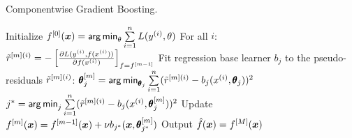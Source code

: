 
\begin{algorithm}[H]
  \begin{footnotesize}
  \begin{center}
  \caption{Componentwise Gradient Boosting.}
    \begin{algorithmic}[1]
      \State Initialize $f^{[0]}(\bm{x}) = \mathop{\sf arg\,min}_{\theta} \sum  \limits_{i=1}^n L(y^{(i)}, \theta)$
        \State For all $i$: $\tilde{r}^{[m](i)} = -\left[\frac{\partial L(y^{(i)}, f(x^{(i)}))}{\partial f(x^{(i)})}\right]_{f=f^{[m-1]}}$
          \State Fit regression base learner $b_j$ to the pseudo-residuals $\tilde{r}^{[m](i)}$:
          \State $\pmb\theta_j^{[m]} = \mathop{\sf arg\,min}_{\pmb\theta_j} \sum  \limits_{i=1}^n (\tilde{r}^{[m](i)} - b_j(x^{(i)}, \pmb\theta_j))^2$
        \EndFor
        \State $j^* = \mathop{\sf arg\,min}_{j} \sum  \limits_{i=1}^n (\tilde{r}^{[m](i)} - b_j(x^{(i)}, \pmb\theta_j^{[m]}))^2$
        \State Update $f^{[m]}(\bm{x}) = f^{[m-1]}(\bm{x}) + \nu b_{j^*}(\bm{x}, \pmb\theta_{j^*}^{[m]})$
      \EndFor
      \State Output $\hat{f}(\bm{x}) = f^{[M]}(\bm{x})$
    \end{algorithmic}
    \end{center}
    \end{footnotesize}
\end{algorithm}
